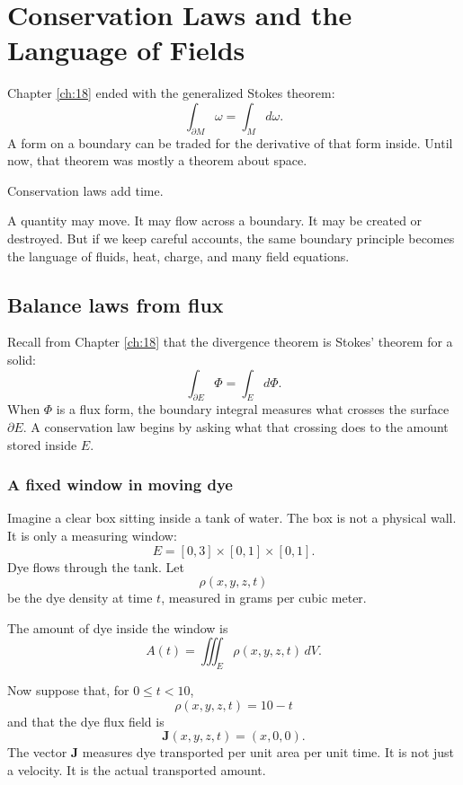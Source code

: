 
\chapter{Conservation Laws and the Language of Fields}
\label{ch:19}

Chapter \ref{ch:18} ended with the generalized Stokes theorem:
\[
    \int_{\partial M}\omega=\int_M d\omega.
\]
A form on a boundary can be traded for the derivative of that form inside.  Until now,
that theorem was mostly a theorem about space.

Conservation laws add time.

A quantity may move.  It may flow across a boundary.  It may be created or destroyed.
But if we keep careful accounts, the same boundary principle becomes the language of
fluids, heat, charge, and many field equations.

\section{Balance laws from flux}
\label{sec:19.1}

Recall from Chapter \ref{ch:18} that the divergence theorem is Stokes' theorem for a
solid:
\[
    \int_{\partial E}\Phi=\int_E d\Phi.
\]
When \(\Phi\) is a flux form, the boundary integral measures what crosses the surface
\(\partial E\).  A conservation law begins by asking what that crossing does to the
amount stored inside \(E\).

\subsection{A fixed window in moving dye}

Imagine a clear box sitting inside a tank of water.  The box is not a physical wall.  It is
only a measuring window:
\[
    E=[0,3]\times[0,1]\times[0,1].
\]
Dye flows through the tank.  Let
\[
    \rho(x,y,z,t)
\]
be the dye density at time \(t\), measured in grams per cubic meter.

The amount of dye inside the window is
\[
\boxed{
    A(t)=\iiint_E \rho(x,y,z,t)\,dV.
}
\]

Now suppose that, for \(0\le t<10\),
\[
    \rho(x,y,z,t)=10-t
\]
and that the dye flux field is
\[
    \mathbf J(x,y,z,t)=(x,0,0).
\]
The vector \(\mathbf J\) measures dye transported per unit area per unit time.  It is not
just a velocity.  It is the actual transported amount.

